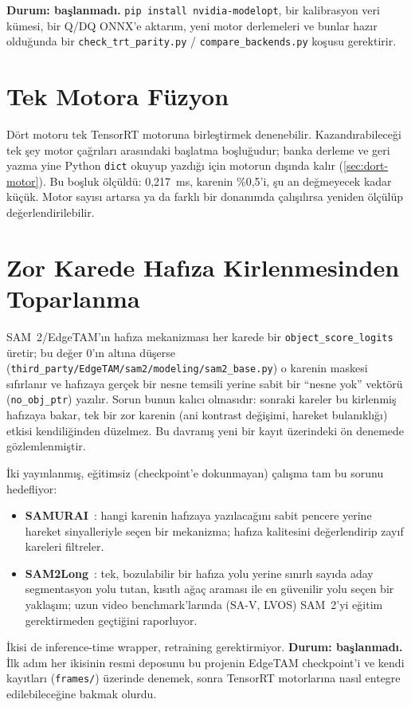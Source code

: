 \textbf{Durum: başlanmadı.} \texttt{pip install nvidia-modelopt}, bir
kalibrasyon veri kümesi, bir Q/DQ ONNX'e aktarım, yeni motor derlemeleri
ve bunlar hazır olduğunda bir \texttt{check\_trt\_parity.py} /
\texttt{compare\_backends.py} koşusu gerektirir.

\section{Tek Motora Füzyon}
\label{sec:fuzyon-karari}

Dört motoru tek TensorRT motoruna birleştirmek denenebilir. Kazandırabileceği
tek şey motor çağrıları arasındaki başlatma boşluğudur; banka derleme ve
geri yazma yine Python \texttt{dict} okuyup yazdığı için motorun dışında
kalır (\cref{sec:dort-motor}). Bu boşluk ölçüldü: 0,217~ms, karenin
\%0,5'i, şu an değmeyecek kadar küçük. Motor sayısı artarsa ya da farklı
bir donanımda çalışılırsa yeniden ölçülüp değerlendirilebilir.

\section{Zor Karede Hafıza Kirlenmesinden Toparlanma}
\label{sec:hafiza-toparlanma}

SAM~2/EdgeTAM'ın hafıza mekanizması her karede bir
\texttt{object\_score\_logits} üretir; bu değer 0'ın altına düşerse
(\texttt{third\_party/EdgeTAM/sam2/modeling/sam2\_base.py}) o karenin
maskesi sıfırlanır ve hafızaya gerçek bir nesne temsili yerine sabit
bir ``nesne yok'' vektörü (\texttt{no\_obj\_ptr}) yazılır. Sorun bunun
kalıcı olmasıdır: sonraki kareler bu kirlenmiş hafızaya bakar, tek bir
zor karenin (ani kontrast değişimi, hareket bulanıklığı) etkisi
kendiliğinden düzelmez. Bu davranış yeni bir kayıt üzerindeki ön
denemede gözlemlenmiştir.

İki yayınlanmış, eğitimsiz (checkpoint'e dokunmayan) çalışma tam bu
sorunu hedefliyor:

\begin{itemize}
  \item \textbf{SAMURAI}~\cite{yang2024samurai}: hangi karenin hafızaya
        yazılacağını sabit pencere yerine hareket sinyalleriyle
        seçen bir mekanizma; hafıza kalitesini değerlendirip zayıf
        kareleri filtreler.
  \item \textbf{SAM2Long}~\cite{ding2024sam2long}: tek, bozulabilir bir
        hafıza yolu yerine sınırlı sayıda aday segmentasyon yolu tutan,
        kısıtlı ağaç araması ile en güvenilir yolu seçen bir yaklaşım;
        uzun video benchmark'larında (SA-V, LVOS) SAM~2'yi eğitim
        gerektirmeden geçtiğini raporluyor.
\end{itemize}

İkisi de inference-time wrapper, retraining gerektirmiyor.
\textbf{Durum: başlanmadı.} İlk adım her ikisinin resmi deposunu bu
projenin EdgeTAM checkpoint'i ve kendi kayıtları (\texttt{frames/})
üzerinde denemek, sonra TensorRT motorlarına nasıl entegre
edilebileceğine bakmak olurdu.
